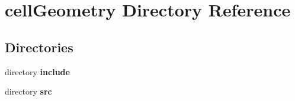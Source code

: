 \section{cell\-Geometry Directory Reference}
\label{dir_11f2b4b01dcef65f778732dee3937232}
\subsection*{Directories}
\begin{DoxyCompactItemize}
\item 
directory {\bf include}
\item 
directory {\bf src}
\end{DoxyCompactItemize}
